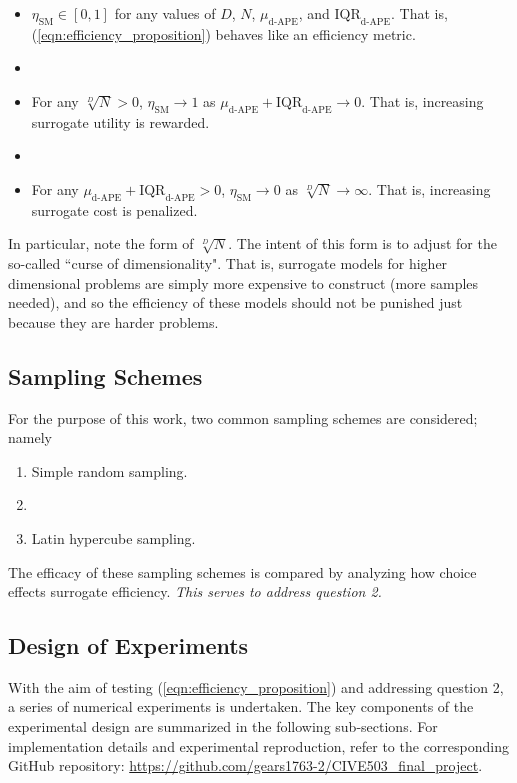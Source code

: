 \documentclass[conference]{IEEEtran}
\begin{document}
\begin{itemize}
	\item $\eta_\textrm{SM} \in [0,1]$ for any values of $D$, $N$, $\mu_\textrm{d-APE}$, and $\textrm{IQR}_\textrm{d-APE}$. That is, (\ref{eqn:efficiency_proposition}) behaves like an efficiency metric.
	\item []
	\item For any $\sqrt[D]{N} > 0$, $\eta_\textrm{SM} \to 1$ as $\mu_\textrm{d-APE} + \textrm{IQR}_\textrm{d-APE} \to 0$. That is, increasing surrogate utility is rewarded.
	\item []
	\item For any $\mu_\textrm{d-APE} + \textrm{IQR}_\textrm{d-APE} > 0$, $\eta_\textrm{SM} \to 0$ as $\sqrt[D]{N} \to \infty$. That is, increasing surrogate cost is penalized.
\end{itemize}

\noindent In particular, note the form of $\sqrt[D]{N}$. The intent of this form is to adjust for the so-called ``curse of dimensionality". That is, surrogate models for higher dimensional problems are simply more expensive to construct (more samples needed), and so the efficiency of these models should not be punished just because they are harder problems.

\subsection{Sampling Schemes}

For the purpose of this work, two common sampling schemes are considered; namely

\begin{enumerate}
	\item Simple random sampling.
	\item []
	\item Latin hypercube sampling.
\end{enumerate}

\noindent The efficacy of these sampling schemes is compared by analyzing how choice effects surrogate efficiency. \textit{This serves to address question 2.}

\subsection{Design of Experiments}

With the aim of testing (\ref{eqn:efficiency_proposition}) and addressing question 2, a series of numerical experiments is undertaken. The key components of the experimental design are summarized in the following sub-sections. For implementation details and experimental reproduction, refer to the corresponding GitHub repository: \url{https://github.com/gears1763-2/CIVE503_final_project}.
\end{document}
